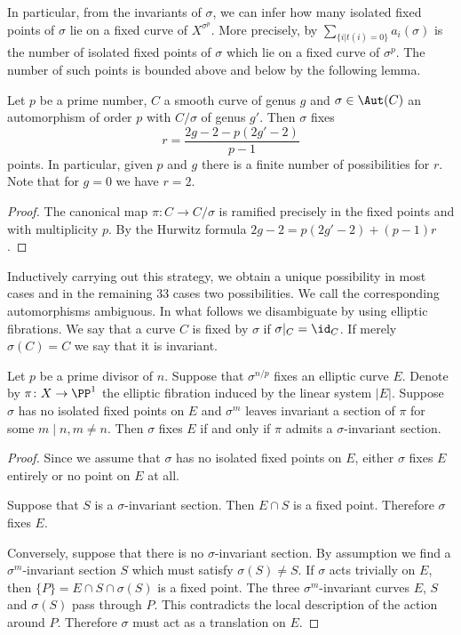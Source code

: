 In particular, from the invariants of $\sigma$, we can infer how many isolated fixed points of $\sigma$ lie on a fixed curve of $X^{\sigma^p}$. More precisely, by  $\sum_{\{i|t(i)=0\}}a_i(\sigma)$ is the number of isolated fixed points of $\sigma$ which lie on a fixed curve of $\sigma^p$.
The number of such points is bounded above and below by the following lemma.
\begin{lemma}
 Let $p$ be a prime number, $C$ a smooth curve of genus $g$ and $\sigma \in \Aut(C)$ an automorphism of order $p$ with $C/\sigma$ of genus $g'$. Then $\sigma$ fixes
 \[r = \frac{2g -2 - p(2g'-2)}{p-1}\]
 points. In particular, given $p$ and $g$ there is a finite number of possibilities for $r$.
 Note that for $g = 0$ we have $r = 2$.
\end{lemma}
\begin{proof}
 The canonical map $\pi\colon C \to C/\sigma$ is ramified precisely in the fixed points and with multiplicity $p$.
 By the Hurwitz formula $2g -2 = p (2 g' - 2) + (p-1)r$.
\end{proof}

Inductively carrying out this strategy, we obtain a unique possibility in most cases and in the remaining $33$ cases two possibilities. We call
the corresponding automorphisms ambiguous. In what follows we disambiguate by using elliptic fibrations.
We say that a curve $C$ is fixed by $\sigma$ if $\sigma|_C=\id_C$. If merely $\sigma(C)=C$ we say that it is invariant.
\begin{lemma}\label{lemma:sect}
 Let $p$ be a prime divisor of $n$. Suppose that $\sigma^{n/p}$ fixes an elliptic curve $E$. Denote by $\pi\colon X \to \PP^1$ the elliptic fibration induced by the linear system $|E|$.
 Suppose $\sigma$ has no isolated fixed points on $E$ and $\sigma^m$ leaves invariant a section of $\pi$ for some $m \mid n, m \neq n$.
 Then $\sigma$ fixes $E$ if and only if $\pi$ admits a $\sigma$-invariant section.
\end{lemma}
\begin{proof}
 Since we assume that $\sigma$ has no isolated fixed points on $E$,
 either $\sigma$ fixes $E$ entirely or no point on $E$ at all.

 Suppose that $S$ is a $\sigma$-invariant section. Then $E \cap S$ is a fixed point. Therefore $\sigma$ fixes $E$.

Conversely, suppose that there is no $\sigma$-invariant section. By assumption we find a $\sigma^m$-invariant section $S$ which must satisfy $\sigma(S) \neq S$.
If $\sigma$ acts trivially on $E$, then $\{P\}=E \cap S \cap \sigma(S)$ is a fixed point. The three $\sigma^m$-invariant curves $E$, $S$ and $\sigma(S)$ pass through $P$. This contradicts the local description of the action around $P$.  Therefore $\sigma$ must act as a translation on $E$.
\end{proof}

